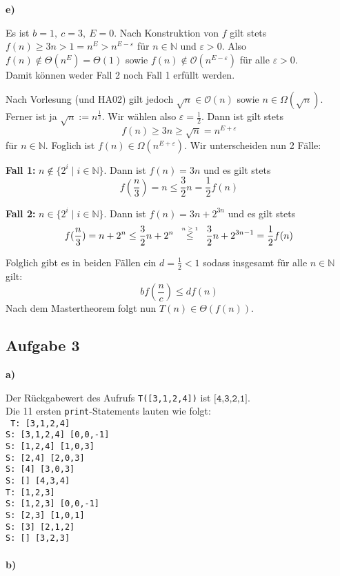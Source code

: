 \documentclass[a4paper,graphics,11pt]{article}
\newcommand{\aufgabe}[1]{\subsection*{Aufgabe #1}}
\newcommand{\up}[2]{\mathrel{\overset{\makebox[0pt]{\mbox{\normalfont\tiny #2}}}{#1}}}
\begin{document}
\textbf{e)}

Es ist $b = 1,\ c = 3,\ E = 0$.
Nach Konstruktion von $f$ gilt stets $f(n) \geq 3n > 1 = n^{E} > n^{E-\varepsilon}$ für $n \in \mathbb{N}$ und
$\varepsilon > 0$. Also $f(n) \notin \Theta(n^E) = \Theta(1)$ sowie $f(n) \notin \mathcal{O}(n^{E - \varepsilon})$ für alle $\varepsilon > 0$.\\
Damit können weder Fall 2 noch Fall 1 erfüllt werden.

Nach Vorlesung (und HA02) gilt jedoch $\sqrt{n} \in \mathcal{O}(n)$ sowie $n \in \Omega(\sqrt{n})$.
Ferner ist ja $\sqrt{n} := n^{\frac{1}{2}}$. Wir wählen also $\varepsilon = \frac{1}{2}$.
Dann ist gilt stets
$$
    f(n) \geq 3n \geq \sqrt{n} = n^{E+\varepsilon}
$$
für $n \in \mathbb{N}$.
Foglich ist $f(n) \in \Omega(n^{E+\varepsilon})$. Wir unterscheiden nun 2 Fälle:

\textbf{Fall 1:} $n \notin \{2^i \mid i \in \mathbb{N}\}$. Dann ist $f(n) = 3n$ und es gilt stets
$$
    f(\frac{n}{3}) = n \leq \frac{3}{2} n = \frac{1}{2} f(n)
$$

\textbf{Fall 2:} $n \in \{2^i \mid i\in \mathbb{N} \}$. Dann ist $f(n) = 3n + 2^{3n}$ und es gilt stets
$$ 
    f(\frac{n}{3}) = n+2^n
    \leq \frac{3}{2}n + 2^{n}
    \quad\up{\leq}{$n \geq 1$}\quad \frac{3}{2}n + 2^{3n - 1}
    = \frac{1}{2} f(n)
$$

Folglich gibt es in beiden Fällen ein $d = \frac{1}{2} < 1$ sodass insgesamt für alle $n \in \mathbb{N}$ gilt:
$$
    bf(\frac{n}{c} ) \leq d f(n)
$$
Nach dem Mastertheorem folgt nun $T(n) \in \Theta(f(n))$.

\aufgabe{3}
\textbf{a)}

Der Rückgabewert des Aufrufs \texttt{T([3,1,2,4])} ist $\texttt{[4,3,2,1]}$.\\
Die 11 ersten \texttt{print}-Statements lauten wie folgt:\\
\texttt{
    T: [3,1,2,4] \\
    S: [3,1,2,4] [0,0,-1]\\
    S: [1,2,4] [1,0,3]\\
    S: [2,4] [2,0,3]\\
    S: [4] [3,0,3]\\
    S: [] [4,3,4]\\
    T: [1,2,3]\\
    S: [1,2,3] [0,0,-1]\\
    S: [2,3] [1,0,1]\\
    S: [3] [2,1,2]\\
    S: [] [3,2,3]\\
}\\
\textbf{b)}
\end{document}
